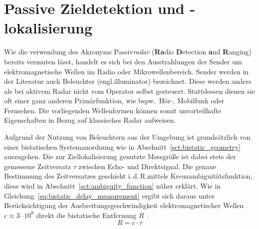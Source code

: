 \section{Passive Zieldetektion und -lokalisierung}

Wie die verwendung des Akronyms Passiv\emph{radar} (\textbf{Ra}dio %
\textbf{D}etection %
\textbf{a}nd \textbf{R}anging) bereits vermuten lässt, handelt es sich bei den Ausstrahlungen der Sender um elektromagnetische Wellen im Radio oder Mikrowellenbereich. Sender werden in der Literatur auch Beleuchter (engl.\@ illuminator) bezeichnet. Diese werden anders als bei aktivem Radar nicht vom Operator selbst gesteuert. Stattdessen dienen sie oft einer ganz anderen Primärfunktion, wie bspw.\ Hör-, Mobilfunk oder Fernsehen. Die vorliegenden Wellenformen können somit unvorteilhafte Eigenschaften in Bezug auf klassisches Radar aufweisen.

Aufgrund der Nutzung von Beleuchtern aus der Umgebung ist grundsätzlich von einer bistatischen Systemanordnung wie in Abschnitt~\ref{sct:bistatic_geometry} auszugehen. Die zur Ziellokalisierung genutzte Messgröße ist dabei stets der gemessene Zeitversatz \(\tau \) zwischen Echo- und Direktsignal. Die genaue Bestimmung des Zeitversatzes geschieht i.\,d.\,R.\@ mittels Kreuzambiguitätsfunktion, diese wird in Abschnitt~\ref{sct:ambiguity_function} näher erklärt. Wie in Gleichung~\ref{eq:bistatic_delay_measurement} ergibt sich daraus unter Berücksichtigung der Ausbreitungsgeschwindigkeit elektromagnetischer Wellen \(c \approx 3\cdot10^8\) direkt die bistatische Entfernung \(R\)~\cite[S.~11]{Malanowski2019}.%
%
\begin{equation}
    R = c \cdot \tau
\end{equation}\label{eq:bistatic_delay_measurement}

